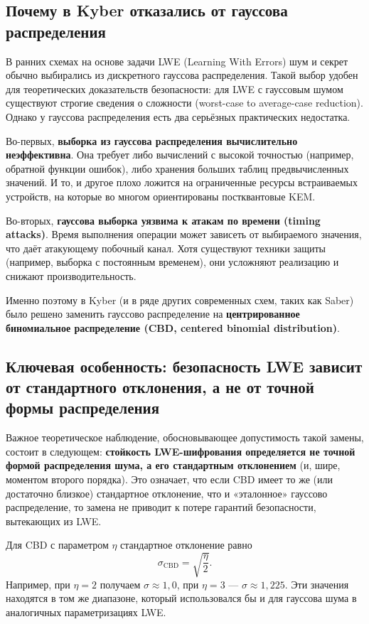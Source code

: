 \documentclass[11pt,a4paper]{article}
\begin{document}
\subsection{Почему в Kyber отказались от гауссова распределения}

В ранних схемах на основе задачи LWE (Learning With Errors) шум и секрет обычно выбирались из дискретного гауссова распределения. Такой выбор удобен для теоретических доказательств безопасности: для LWE с гауссовым шумом существуют строгие сведения о сложности (worst-case to average-case reduction). Однако у гауссова распределения есть два серьёзных практических недостатка.

Во-первых, \textbf{выборка из гауссова распределения вычислительно неэффективна}. Она требует либо вычислений с высокой точностью (например, обратной функции ошибок), либо хранения больших таблиц предвычисленных значений. И то, и другое плохо ложится на ограниченные ресурсы встраиваемых устройств, на которые во многом ориентированы постквантовые KEM.

Во-вторых, \textbf{гауссова выборка уязвима к атакам по времени (timing attacks)}. Время выполнения операции может зависеть от выбираемого значения, что даёт атакующему побочный канал. Хотя существуют техники защиты (например, выборка с постоянным временем), они усложняют реализацию и снижают производительность.

Именно поэтому в Kyber (и в ряде других современных схем, таких как Saber) было решено заменить гауссово распределение на \textbf{центрированное биномиальное распределение (CBD, centered binomial distribution)}.

\subsection{Ключевая особенность: безопасность LWE зависит от стандартного отклонения, а не от точной формы распределения}

Важное теоретическое наблюдение, обосновывающее допустимость такой замены, состоит в следующем: \textbf{стойкость LWE-шифрования определяется не точной формой распределения шума, а его стандартным отклонением} (и, шире, моментом второго порядка). Это означает, что если CBD имеет то же (или достаточно близкое) стандартное отклонение, что и «эталонное» гауссово распределение, то замена не приводит к потере гарантий безопасности, вытекающих из LWE.

Для CBD с параметром \(\eta\) стандартное отклонение равно
\[
    \sigma_{\mathrm{CBD}} = \sqrt{\frac{\eta}{2}}.
\]
Например, при \(\eta=2\) получаем \(\sigma \approx 1{,}0\), при \(\eta=3\) — \(\sigma \approx 1{,}225\). Эти значения находятся в том же диапазоне, который использовался бы и для гауссова шума в аналогичных параметризациях LWE.
\end{document}
